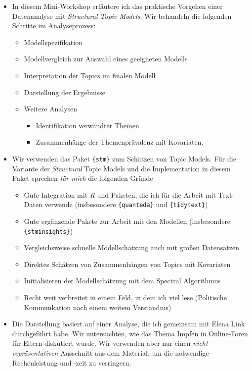 \documentclass[
]{book}
\providecommand{\tightlist}{%
  \setlength{\itemsep}{0pt}\setlength{\parskip}{0pt}}
\begin{document}
\begin{itemize}
\tightlist
\item
  In diesem Mini-Workshop erläutere ich das praktische Vorgehen einer Datenanalyse mit \emph{Structural Topic Models}. Wir behandeln die folgenden Schritte im Analyseprozess:

  \begin{itemize}
  \tightlist
  \item
    Modellspezifikation
  \item
    Modellvergleich zur Auswahl eines geeigneten Modells
  \item
    Interpretation der Topics im finalen Modell
  \item
    Darstellung der Ergebnisse
  \item
    Weitere Analysen

    \begin{itemize}
    \tightlist
    \item
      Identifikation verwandter Themen
    \item
      Zusammenhänge der Themenprävalenz mit Kovariaten.
    \end{itemize}
  \end{itemize}
\item
  Wir verwenden das Paket \texttt{\{stm\}} \citep{robertsStmPackageStructural2019} zum Schätzen von Topic Models. Für die Variante der \emph{Structural} Topic Models und die Implementation in diesem Paket sprechen \emph{für mich} die folgenden Gründe

  \begin{itemize}
  \tightlist
  \item
    Gute Integration mit \emph{R} und Paketen, die ich für die Arbeit mit Text-Daten verwende (insbesondere \texttt{\{quanteda\}} und \texttt{\{tidytext\}})
  \item
    Gute ergänzende Pakete zur Arbeit mit den Modellen (insbesondere \texttt{\{stminsights\}})
  \item
    Vergleichsweise schnelle Modellschätzung auch mit großen Datensätzen
  \item
    Direktes Schätzen von Zusammenhängen von Topics mit Kovariaten
  \item
    Initialisieren der Modellschätzung mit dem Spectral Algorithmus
  \item
    Recht weit verbreitet in einem Feld, in dem ich viel lese (Politische Kommunkation nach einem weitem Verständnis)
  \end{itemize}
\item
  Die Darstellung basiert auf einer Analyse, die ich gemeinsam mit Elena Link durchgeführt habe. Wir untersuchten, wie das Thema Impfen in Online-Foren für Eltern diskutiert wurde. Wir verwenden aber nur einen \emph{nicht repräsentativen} Ausschnitt aus dem Material, um die notwendige Rechenleistung und -zeit zu verringern.


\end{itemize}
\end{document}
